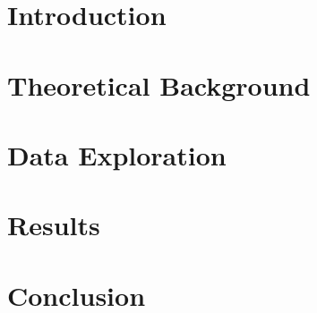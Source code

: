 \documentclass[a4paper, 12pt, oneside]{book}
\begin{document}
%

\chapter{Introduction}

\chapter{Theoretical Background}
 

\chapter{Data Exploration}


\chapter{Results}

\chapter{Conclusion}


\end{document}
